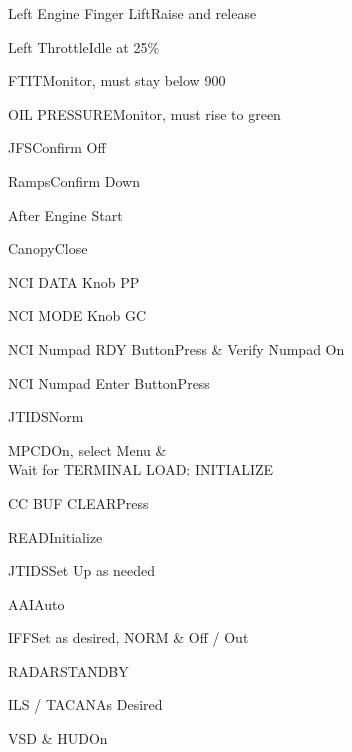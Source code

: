 \documentclass[sim-use]{checklist}
\begin{document}
\begin{continuedchecklist}
	 {
		\item{Left Engine Finger Lift}{Raise and release}
		\item{Left Throttle}{Idle at 25\%}
		\item{FTIT}{Monitor, must stay below 900}
		\item{OIL PRESSURE}{Monitor, must rise to green}
	}
	\item{JFS}{Confirm Off}
	\item{Ramps}{Confirm Down}
\end{continuedchecklist}

\begin{checklist}{After Engine Start}
	\item{Canopy}{Close}
	 {
		\item{NCI DATA Knob} {PP}
		\item{NCI MODE Knob} {GC}
		\item{NCI Numpad RDY Button}{Press \& Verify Numpad On}
		\item{NCI Numpad Enter Button}{Press}
	}
	\item{JTIDS}{Norm}
	\item{MPCD}{On, select Menu \&\\Wait for TERMINAL LOAD: INITIALIZE}
	 {
		\item{CC BUF CLEAR}{Press}
		\item{READ}{Initialize}
	}
	 {
		\item{JTIDS}{Set Up as needed}
		\item{AAI}{Auto}
		\item{IFF}{Set as desired, NORM \& Off / Out}
		\item{RADAR}{STANDBY}
		\item{ILS / TACAN}{As Desired}
		\item{VSD \& HUD}{On}
	}
\end{checklist}
\end{document}
